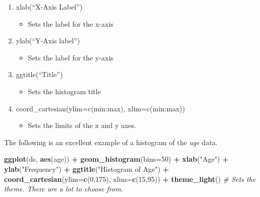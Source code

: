 \documentclass[]{article}
\newenvironment{Shaded}{\begin{snugshade}}{\end{snugshade}}
\newcommand{\KeywordTok}[1]{\textcolor[rgb]{0.13,0.29,0.53}{\textbf{#1}}}
\newcommand{\DataTypeTok}[1]{\textcolor[rgb]{0.13,0.29,0.53}{#1}}
\newcommand{\DecValTok}[1]{\textcolor[rgb]{0.00,0.00,0.81}{#1}}
\newcommand{\StringTok}[1]{\textcolor[rgb]{0.31,0.60,0.02}{#1}}
\newcommand{\CommentTok}[1]{\textcolor[rgb]{0.56,0.35,0.01}{\textit{#1}}}
\newcommand{\OperatorTok}[1]{\textcolor[rgb]{0.81,0.36,0.00}{\textbf{#1}}}
\newcommand{\NormalTok}[1]{#1}
\providecommand{\tightlist}{%
  \setlength{\itemsep}{0pt}\setlength{\parskip}{0pt}}
\begin{document}
\begin{enumerate}
\def\labelenumi{\arabic{enumi}.}
\tightlist
\item
  xlab(``X-Axis Label'')

  \begin{itemize}
  \tightlist
  \item
    Sets the label for the x-axis
  \end{itemize}
\item
  ylab(``Y-Axis label'')

  \begin{itemize}
  \tightlist
  \item
    Sets the label for the y-axis
  \end{itemize}
\item
  ggtitle(``Title'')

  \begin{itemize}
  \tightlist
  \item
    Sets the histogram title
  \end{itemize}
\item
  coord\_cartesian(ylim=c(min:max), xlim=c(min:max))

  \begin{itemize}
  \tightlist
  \item
    Sets the limits of the x and y axes.
  \end{itemize}
\end{enumerate}

The following is an excellent example of a histogram of the \emph{age}
data.

\begin{Shaded}
\begin{Highlighting}[]
\KeywordTok{ggplot}\NormalTok{(ds, }\KeywordTok{aes}\NormalTok{(age)) }\OperatorTok{+}
\StringTok{  }\KeywordTok{geom_histogram}\NormalTok{(}\DataTypeTok{bins=}\DecValTok{50}\NormalTok{) }\OperatorTok{+}\StringTok{ }
\StringTok{  }\KeywordTok{xlab}\NormalTok{(}\StringTok{"Age"}\NormalTok{) }\OperatorTok{+}
\StringTok{  }\KeywordTok{ylab}\NormalTok{(}\StringTok{"Frequency"}\NormalTok{) }\OperatorTok{+}
\StringTok{  }\KeywordTok{ggtitle}\NormalTok{(}\StringTok{"Histogram of Age"}\NormalTok{) }\OperatorTok{+}
\StringTok{  }\KeywordTok{coord_cartesian}\NormalTok{(}\DataTypeTok{ylim=}\KeywordTok{c}\NormalTok{(}\DecValTok{0}\NormalTok{,}\DecValTok{175}\NormalTok{), }\DataTypeTok{xlim=}\KeywordTok{c}\NormalTok{(}\DecValTok{15}\NormalTok{,}\DecValTok{95}\NormalTok{)) }\OperatorTok{+}
\StringTok{  }\KeywordTok{theme_light}\NormalTok{() }\CommentTok{# Sets the theme. There are a lot to choose from.}
\end{Highlighting}
\end{Shaded}
\end{document}
